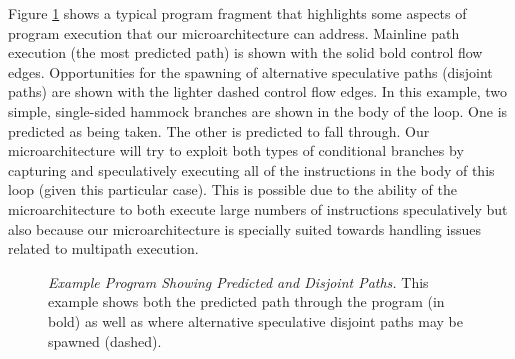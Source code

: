 Figure \ref{fig:disjoint} shows a typical program fragment that
highlights some aspects of program execution that our microarchitecture
can address.
Mainline path execution (the most predicted path) is shown with the
solid bold control flow edges.  Opportunities for the spawning of alternative
speculative paths (disjoint paths) are shown with the lighter dashed
control flow edges.  In this example, two simple, single-sided hammock 
branches are shown in the body of the loop.  One is predicted as
being taken.  The other is predicted to fall through.  Our microarchitecture
will try to exploit both types of conditional branches by capturing
and speculatively executing
all of the instructions in the body of this loop (given this particular
case).  This is possible due to the ability of the microarchitecture to
both execute large numbers of instructions speculatively but also
because our microarchitecture is specially suited towards handling
issues related to multipath execution.
%
\begin{figure}
\centering
{}
\caption{{\em Example Program Showing Predicted and Disjoint
Paths.} 
This example shows both the predicted path through the program 
(in bold) as
well as where alternative speculative disjoint paths may be
spawned (dashed).}
\label{fig:disjoint}
\end{figure}

